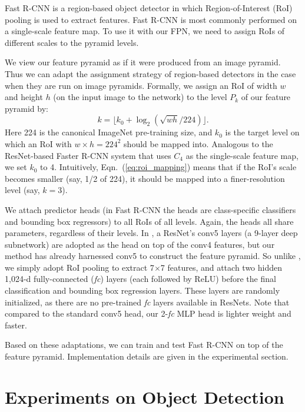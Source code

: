 \documentclass[10pt,twocolumn,letterpaper]{article}
\begin{document}
Fast R-CNN \cite{Girshick2015a} is a region-based object detector in which Region-of-Interest (RoI) pooling is used to extract features.
Fast R-CNN is most commonly performed on a single-scale feature map.
To use it with our FPN, we need to assign RoIs of different scales to the pyramid levels.

We view our feature pyramid as if it were produced from an image pyramid. Thus we can adapt the assignment strategy of region-based detectors \cite{He2014,Girshick2015a} in the case when they are run on image pyramids. 
Formally, we assign an RoI of width $w$ and height $h$ (on the input image to the network) to the level $P_k$ of our feature pyramid by: 
\begin{equation}\label{eq:roi_mapping}
k=\lfloor k_0+\log_2(\sqrt{wh}/224) \rfloor.
\end{equation}
Here 224 is the canonical ImageNet pre-training size, and $k_0$ is the target level on which an RoI with $w\times h=224^2$ should be mapped into.
Analogous to the ResNet-based Faster R-CNN system \cite{He2016} that uses $C_4$ as the single-scale feature map, we set $k_0$ to 4.
Intuitively, Eqn.~(\ref{eq:roi_mapping}) means that if the RoI's scale becomes smaller (say, 1/2 of 224), it should be mapped into a finer-resolution level (say, $k=3$).

We attach predictor heads (in Fast R-CNN the heads are class-specific classifiers and bounding box regressors) to all RoIs of all levels.
Again, the heads all share parameters, regardless of their levels.
In \cite{He2016}, a ResNet's conv5 layers (a 9-layer deep subnetwork) are adopted as the head on top of the conv4 features, but our method has already harnessed conv5 to construct the feature pyramid.
So unlike \cite{He2016}, we simply adopt RoI pooling to extract 7$\times$7 features, and attach two hidden 1,024-d fully-connected (\emph{fc}) layers (each followed by ReLU) before the final classification and bounding box regression layers.
These layers are randomly initialized, as there are no pre-trained \emph{fc} layers available in ResNets.
Note that compared to the standard conv5 head, our 2-\emph{fc} MLP head is lighter weight and faster.

Based on these adaptations, we can train and test Fast R-CNN on top of the feature pyramid.
Implementation details are given in the experimental section.  

\section{Experiments on Object Detection}
\end{document}
